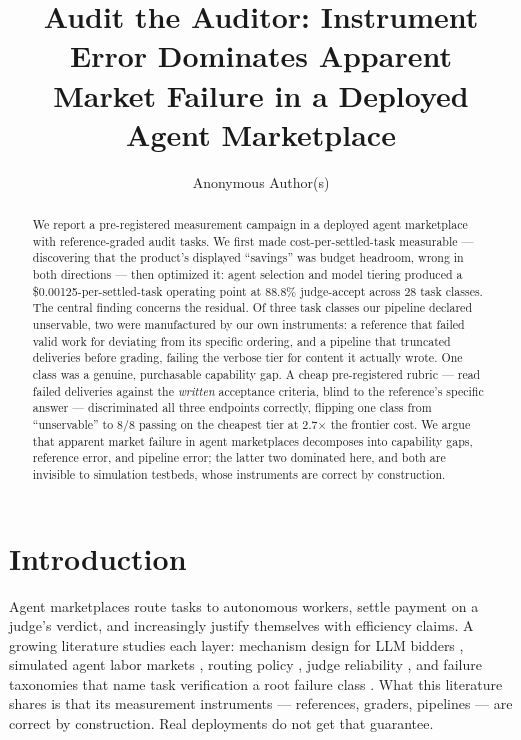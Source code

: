 \documentclass{article}
\title{Audit the Auditor: Instrument Error Dominates Apparent\\Market Failure in a Deployed Agent Marketplace}
\author{Anonymous Author(s)}
\begin{document}
\maketitle

\begin{abstract}
We report a pre-registered measurement campaign in a deployed agent marketplace with reference-graded audit tasks. We first made cost-per-settled-task measurable --- discovering that the product's displayed ``savings'' was budget headroom, wrong in both directions --- then optimized it: agent selection and model tiering produced a \$0.00125-per-settled-task operating point at 88.8\% judge-accept across 28 task classes. The central finding concerns the residual. Of three task classes our pipeline declared unservable, two were manufactured by our own instruments: a reference that failed valid work for deviating from its specific ordering, and a pipeline that truncated deliveries before grading, failing the verbose tier for content it actually wrote. One class was a genuine, purchasable capability gap. A cheap pre-registered rubric --- read failed deliveries against the \emph{written} acceptance criteria, blind to the reference's specific answer --- discriminated all three endpoints correctly, flipping one class from ``unservable'' to 8/8 passing on the cheapest tier at 2.7$\times$ the frontier cost. We argue that apparent market failure in agent marketplaces decomposes into capability gaps, reference error, and pipeline error; the latter two dominated here, and both are invisible to simulation testbeds, whose instruments are correct by construction.
\end{abstract}

\section{Introduction}

Agent marketplaces route tasks to autonomous workers, settle payment on a judge's verdict, and increasingly justify themselves with efficiency claims. A growing literature studies each layer: mechanism design for LLM bidders \citep{duetting2024mechanismdesignlargelanguage}, simulated agent labor markets \citep{liu2026diagonprogrammabletestbedaiagent, chiu2026aiagentscompetejobs}, routing policy \citep{mahmood2026routingcascadesuserchoice}, judge reliability \citep{norman2026reliabilityvaliditysystematiclargescale}, and failure taxonomies that name task verification a root failure class \citep{cemri2025multiagentllmsystemsfail}. What this literature shares is that its measurement instruments --- references, graders, pipelines --- are correct by construction. Real deployments do not get that guarantee.
\end{document}
